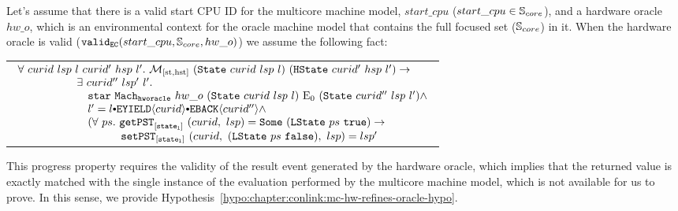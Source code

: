 \begin{lemma}
\label{lemma:chapter:conlink:mc-hw-refines-oracle-progress}

Let's assume that there is a valid start CPU ID for the multicore machine model, 
$start\_cpu$ ($start\_cpu \in {\mathbb{S}_{core}}$), and a hardware oracle $hw\_o$,  
which is an environmental context for the oracle machine model that contains the full focused set (${\mathbb{S}_{core}}$) in it.
When the hardware oracle is valid ($ {{\mathrm{\texttt{valid}}}_{{\mathrm{\texttt{EC}}}}}({start\_cpu}, {{\mathbb{S}_{core}}}, {hw\_o})$) we assume the following fact:
\begin{center}
\begin{tabular}{P{0.95\textwidth}}
$
\begin{array}{l}
\forall \ curid \ lsp \ l \ curid' \ hsp \ l' . \ \matchstatehstate{(\mcstate{curid}{lsp}{l})}{(\hstate{curid'}{hsp}{l'})} \rightarrow \\
\ \ \ \ \ \ \ \ \ \ \ \ \ \ \ \  \exists \ curid'' \ lsp' \ l'  . \ \\
\ \ \ \ \ \ \ \ \ \ \ \ \ \ \ \  \ \ \ \ccstarstep{\oraclestep{hw\_o}{(\mcstate{curid}{lsp}{l})}{\ccemptytrace}{(\mcstate{curid''}{lsp}{l'})}} \wedge\\
\ \ \ \ \ \ \ \ \ \ \ \ \ \ \ \  \ \ \ l' = \listconsoppo{\yieldbackev{curid''}}{\listconsoppo{\yieldev{curid}}{l}} \wedge\\
\ \ \ \ \ \ \ \ \ \ \ \ \ \ \ \  \ \ \ (\forall \ ps  . \ \getpstsome{\localstatekwd}{curid}{lsp}{(\localstate{ps}{\btrue})} \rightarrow \\
\ \ \ \ \ \ \ \ \ \ \ \ \ \ \ \  \ \ \ \ \ \ \ \ \ \  \ \ \setpst{\localstatekwd}{curid}{(\localstate{ps}{\bfalse})}{lsp}{lsp'} \\
\end{array}
$
\end{tabular}
\end{center}
\end{lemma}
This progress property requires the validity of the result event generated by the hardware oracle, which implies
that the returned value is exactly matched with the single instance of the evaluation performed 
by the multicore machine model, which is not available for us to prove. 
In this sense, we  provide Hypothesis~\ref{hypo:chapter:conlink:mc-hw-refines-oracle-hypo}.

